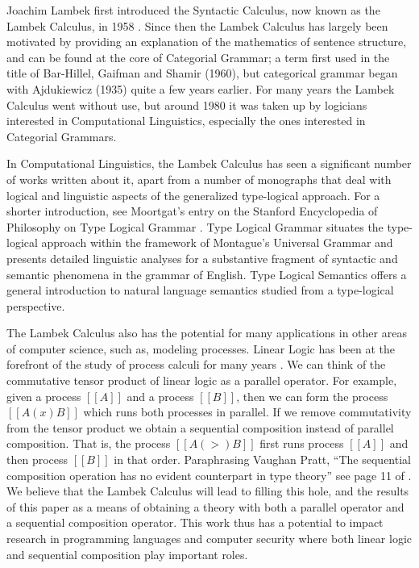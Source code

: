 Joachim Lambek first introduced the Syntactic Calculus, now known as
the Lambek Calculus, in 1958 \cite{Lambek1958}.  Since then the Lambek
Calculus has largely been motivated by providing an explanation of the
mathematics of sentence structure, and can be found at the core of
Categorial Grammar; a term first used in the title of Bar-Hillel,
Gaifman and Shamir (1960), but categorical grammar began with
Ajdukiewicz (1935) quite a few years earlier. For many years the
Lambek Calculus went without use, but around 1980 it was taken up by
logicians interested in Computational Linguistics, especially the ones
interested in Categorial Grammars.

In Computational Linguistics, the Lambek Calculus has seen a
significant number of works written about it, apart from a number of
monographs that deal with logical and linguistic aspects of the
generalized type-logical approach.  For a shorter introduction, see
Moortgat's entry on the Stanford Encyclopedia of Philosophy on Type
Logical Grammar \cite{MoortgatSEP}.  Type Logical Grammar situates the
type-logical approach within the framework of Montague's Universal
Grammar and presents detailed linguistic analyses for a substantive
fragment of syntactic and semantic phenomena in the grammar of
English.  Type Logical Semantics offers a general introduction to
natural language semantics studied from a type-logical perspective.

The Lambek Calculus also has the potential for many applications in
other areas of computer science, such as, modeling processes.  Linear
Logic has been at the forefront of the study of process calculi for
many years \cite{HONDA20102223,Pratt:1997,ABRAMSKY19945}. We can think
of the commutative tensor product of linear logic as a parallel
operator.  For example, given a process $[[A]]$ and a process $[[B]]$,
then we can form the process $[[A (x) B]]$ which runs both processes
in parallel.  If we remove commutativity from the tensor product we
obtain a sequential composition instead of parallel composition.  That
is, the process $[[A (>) B]]$ first runs process $[[A]]$ and then
process $[[B]]$ in that order.  Paraphrasing Vaughan Pratt, ``The
sequential composition operation has no evident counterpart in type
theory'' see page 11 of \cite{Pratt:1997}.  We believe that the Lambek
Calculus will lead to filling this hole, and the results of this paper
as a means of obtaining a theory with both a parallel operator and a
sequential composition operator.  This work thus has a potential to
impact research in programming languages and computer security where
both linear logic and sequential composition play important roles.

